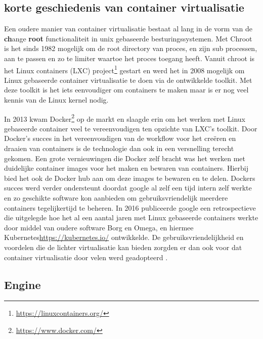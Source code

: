 \subsection{korte geschiedenis van container virtualisatie}

Een oudere manier van container virtualisatie bestaat al lang in de vorm van de \textbf{ch}ange \textbf{root} functionaliteit in unix gebaseerde besturingssystemen. Met Chroot is het sinds 1982 mogelijk om de root directory van proces, en zijn sub processen, aan te passen en zo te limiter waartoe het proces toegang heeft. Vanuit chroot is het Linux containers (LXC) project\footnote{\url{https://linuxcontainers.org/}} gestart en werd het in 2008 mogelijk om Linux gebaseerde container virtualisatie te doen via de ontwikkelde toolkit. Met deze toolkit is het iets eenvoudiger om containers te maken maar is er nog veel kennis van de Linux kernel nodig\autocite{Eder2016,SenthilKumaran2017}.

In 2013 kwam Docker\footnote{\url{https://www.docker.com/}} op de markt en slaagde erin om het werken met Linux gebaseerde container veel te vereenvoudigen ten opzichte van LXC’s toolkit\autocite{Hykes2013}. Door Docker’s succes in het vereenvoudigen van de workflow voor het creëren en draaien van containers is de technologie dan ook in een versnelling terecht gekomen.  Een grote vernieuwingen die Docker zelf bracht was het werken met duidelijke container images voor het maken en bewaren van containers. Hierbij bied het ook de Docker hub aan om deze images te bewaren en te delen. Dockers succes werd verder ondersteunt doordat google  al zelf een tijd intern zelf werkte en zo geschikte software kon aanbieden om gebruiksvriendelijk  meerdere containers tegelijkertijd te beheren. In 2016 publiceerde google een retrospectieve die uitgelegde hoe het al een aantal jaren met Linux gebaseerde containers werkte door middel van oudere software Borg en Omega, en hiermee Kubernetes{\url{https://kubernetes.io/}} ontwikkelde. De gebruiksvriendelijkheid en voordelen die de lichter virtualisatie kan bieden zorgden er dan ook voor dat container virtualisatie door velen werd geadopteerd \autocite{Eder2016}.

\subsection{Engine}

